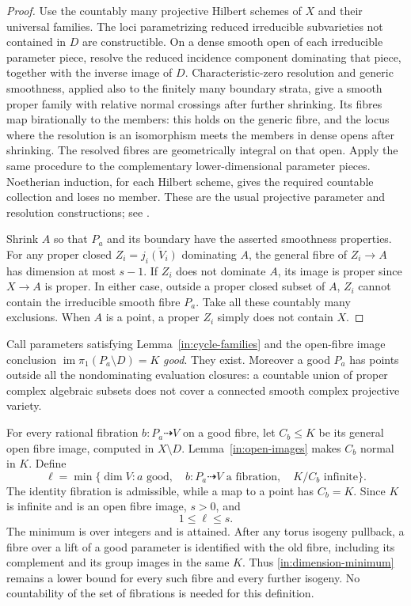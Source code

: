 \begin{proof}
Use the countably many projective Hilbert schemes of $X$ and their
universal families.  The loci parametrizing reduced irreducible
subvarieties not contained in $D$ are constructible.  On a dense smooth
open of each irreducible parameter piece, resolve the reduced incidence
component dominating that piece, together with the inverse image of
$D$.  Characteristic-zero resolution and generic smoothness, applied
also to the finitely many boundary strata, give a smooth proper family
with relative normal crossings after further shrinking.  Its fibres
map birationally to the members: this holds on the generic fibre, and
the locus where the resolution is an isomorphism meets the members in
dense opens after shrinking.  The resolved fibres are geometrically
integral on that open.  Apply the same procedure to the complementary
lower-dimensional parameter pieces.  Noetherian induction, for each
Hilbert scheme, gives the required countable collection and loses no
member.  These are the usual projective parameter and resolution
constructions; see \cite{Hironaka,Stacks}.

Shrink $A$ so that $P_a$ and its boundary have the asserted smoothness
properties.  For any proper closed $Z_i=\overline{j_i(V_i)}$ dominating
$A$, the general fibre of $Z_i\to A$ has dimension at most $s-1$.
If $Z_i$ does not dominate $A$, its image is proper since $X\to A$
is proper.  In either case, outside a proper closed subset of $A$,
$Z_i$ cannot contain the irreducible smooth fibre $P_a$.  Take all
these countably many exclusions.  When $A$ is a point, a proper
$Z_i$ simply does not contain $X$.
\end{proof}

Call parameters satisfying Lemma~\ref{in:cycle-families} and the
open-fibre image conclusion $\operatorname{im}\pi_1(P_a\setminus D)=K$
\emph{good}.  They exist.  Moreover a good $P_a$ has points outside
all the nondominating evaluation closures: a countable union of
proper complex algebraic subsets does not cover a connected smooth
complex projective variety.

For every rational fibration $b:P_a\dashrightarrow V$ on a good
fibre, let $C_b\le K$ be its general open fibre image, computed in
$X\setminus D$.  Lemma~\ref{in:open-images} makes $C_b$ normal in
$K$.  Define
\begin{equation}\label{in:dimension-minimum}
 \ell=\min\{\dim V: a\text{ good},\quad
 b:P_a\dashrightarrow V\text{ a fibration},\quad K/C_b\text{ infinite}\}.
\end{equation}
The identity fibration is admissible, while a map to a point has
$C_b=K$.  Since $K$ is infinite and is an open fibre image, $s>0$,
and
\begin{equation}\label{in:ell-range}
 1\le\ell\le s.
\end{equation}
The minimum is over integers and is attained.  After any torus
isogeny pullback, a fibre over a lift of a good parameter is identified
with the old fibre, including its complement and its group images in
the same $K$.  Thus \eqref{in:dimension-minimum} remains a lower bound
for every such fibre and every further isogeny.  No countability of
the set of fibrations is needed for this definition.

